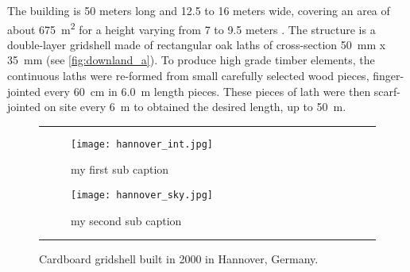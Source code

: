 The building is 50 meters long and 12.5 to 16 meters wide, covering an area of about \SI{675}{m^2} for a height varying from 7 to 9.5 meters \cite{Harris2002}. The structure is a double-layer gridshell made of rectangular oak laths of cross-section \SI{50}{mm} x \SI{35}{mm} (see \cref{fig:downland_a}). To produce high grade timber elements, the continuous laths were re-formed from small carefully selected wood pieces, finger-jointed every \SI{60}{cm} in \SI{6.0}{m} length pieces. These pieces of lath were then scarf-jointed on site every \SI{6}{m} to obtained the desired length, up to \SI{50}{m}.



\captionsetup{subrefformat=parens}

\begin{figure}[t]
\hrule
	\begin{subfigure}[b]{0.32\MediaWidth}
		\texttt{[image: hannover\_int.jpg]}
		\caption{my first sub caption}
		\label{fig:hannover_a}
	\end{subfigure}
\hspace{\fill}%
	\begin{subfigure}[b]{0.64\MediaWidth}
		\texttt{[image: hannover\_sky.jpg]}
		\caption{my second sub caption}
		\label{fig:hannover_b}
	\end{subfigure}
\caption{Cardboard gridshell built in 2000 in Hannover, Germany.}
\label{fig:hannover}
\hrule
\end{figure}

